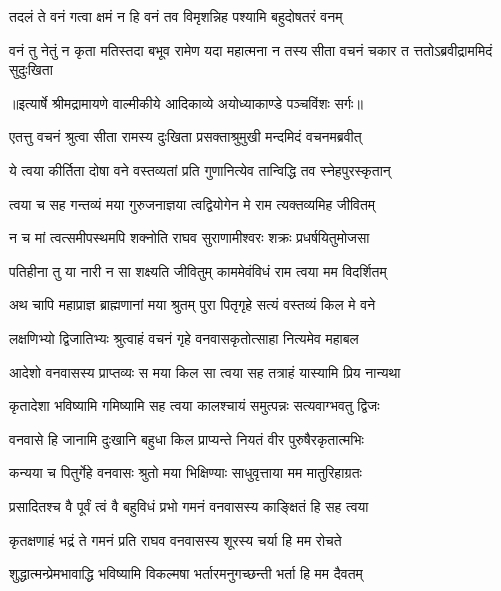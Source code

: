 \twolineshloka
{तदलं ते वनं गत्वा क्षमं न हि वनं तव}
{विमृशन्निह पश्यामि बहुदोषतरं वनम्} %

\fourlineindentedshloka
{वनं तु नेतुं न कृता मतिस्तदा}
{ बभूव रामेण यदा महात्मना}
{न तस्य सीता वचनं चकार त}
{त्ततोऽब्रवीद्राममिदं सुदुःखिता} %


{॥इत्यार्षे श्रीमद्रामायणे वाल्मीकीये आदिकाव्ये अयोध्याकाण्डे पञ्चविंशः सर्गः॥}


\twolineshloka
{एतत्तु वचनं श्रुत्वा सीता रामस्य दुःखिता}
{प्रसक्ताश्रुमुखी मन्दमिदं वचनमब्रवीत्} %

\twolineshloka
{ये त्वया कीर्तिता दोषा वने वस्तव्यतां प्रति}
{गुणानित्येव तान्विद्धि तव स्नेहपुरस्कृतान्} %

\twolineshloka
{त्वया च सह गन्तव्यं मया गुरुजनाज्ञया}
{त्वद्वियोगेन मे राम त्यक्तव्यमिह जीवितम्} %

\twolineshloka
{न च मां त्वत्समीपस्थमपि शक्नोति राघव}
{सुराणामीश्वरः शक्रः प्रधर्षयितुमोजसा} %

\twolineshloka
{पतिहीना तु या नारी न सा शक्ष्यति जीवितुम्}
{काममेवंविधं राम त्वया मम विदर्शितम्} %

\twolineshloka
{अथ चापि महाप्राज्ञ ब्राह्मणानां मया श्रुतम्}
{पुरा पितृगृहे सत्यं वस्तव्यं किल मे वने} %

\twolineshloka
{लक्षणिभ्यो द्विजातिभ्यः श्रुत्वाहं वचनं गृहे}
{वनवासकृतोत्साहा नित्यमेव महाबल} %

\twolineshloka
{आदेशो वनवासस्य प्राप्तव्यः स मया किल}
{सा त्वया सह तत्राहं यास्यामि प्रिय नान्यथा} %

\twolineshloka
{कृतादेशा भविष्यामि गमिष्यामि सह त्वया}
{कालश्चायं समुत्पन्नः सत्यवाग्भवतु द्विजः} %

\twolineshloka
{वनवासे हि जानामि दुःखानि बहुधा किल}
{प्राप्यन्ते नियतं वीर पुरुषैरकृतात्मभिः} %

\twolineshloka
{कन्यया च पितुर्गेहे वनवासः श्रुतो मया}
{भिक्षिण्याः साधुवृत्ताया मम मातुरिहाग्रतः} %

\twolineshloka
{प्रसादितश्च वै पूर्वं त्वं वै बहुविधं प्रभो}
{गमनं वनवासस्य काङ्क्षितं हि सह त्वया} %

\twolineshloka
{कृतक्षणाहं भद्रं ते गमनं प्रति राघव}
{वनवासस्य शूरस्य चर्या हि मम रोचते} %

\twolineshloka
{शुद्धात्मन्प्रेमभावाद्धि भविष्यामि विकल्मषा}
{भर्तारमनुगच्छन्ती भर्ता हि मम दैवतम्} %

